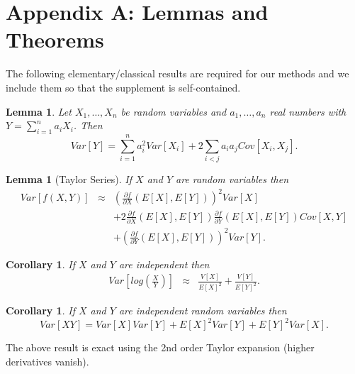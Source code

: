 \documentclass[12pt]{amsart}
\newtheorem{lemma}[thm]{Lemma}
\newtheorem{cor}[thm]{Corollary}
\theoremstyle{definition}
\begin{document}
\section{Appendix A: Lemmas and Theorems}

The following elementary/classical results are required for our methods and we include them so that the supplement is self-contained.

\begin{lemma}
\label{lemma:varsum}
Let $X_1,\ldots,X_n$ be random variables and $a_1,\ldots,a_n$ real numbers with $Y=\sum_{i=1}^na_iX_i$. Then
\begin{equation}
Var[Y] = \sum_{i=1}^n a_i^2Var[X_i]+2\sum_{i<j} a_ia_j Cov[X_i,X_j].
\end{equation}
\end{lemma}
\begin{lemma}[Taylor Series]
If $X$ and $Y$ are random variables then
\begin{eqnarray}
  Var[f(X,Y)] & \approx & \left(\frac{\partial f}{\partial X}(E[X],E[Y])\right)^2Var[X] \nonumber \\ & &+2\frac{\partial f}{\partial X}(E[X],E[Y])\frac{\partial f}{\partial Y}(E[X],E[Y])Cov[X,Y] \nonumber \\ & & +\left( \frac{\partial f}{\partial Y}(E[X],E[Y])\right)^2 Var[Y].
\end{eqnarray}
\end{lemma}
\begin{cor}
If $X$ and $Y$ are independent then
\begin{eqnarray}
  Var\left[log\left(\frac{X}{Y}\right)\right] & \approx & \frac{V[X]}{E[X]^2} + \frac{V[Y]}{E[Y]^2}.
\end{eqnarray}
\end{cor}
\begin{cor}
\label{lemma:varproduct}
If $X$ and $Y$ are independent random variables then
\begin{equation}
Var[XY] = Var[X]Var[Y]+E[X]^2Var[Y]+E[Y]^2Var[X].
\end{equation}
\end{cor}

The above result is exact using the 2nd order Taylor expansion (higher
derivatives vanish).
\end{document}

